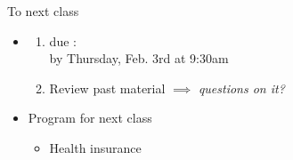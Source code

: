 \begin{frame}{To next class}
    \begin{itemize}
        \item {}
        \begin{enumerate}
            \item {} due :\\
            by Thursday, Feb. 3rd at 9:30am
            \item Review past material $\implies$ \textit{questions on it?}
        \end{enumerate}
        \vspace{5mm}

        \item Program for next class
        \begin{itemize}
            \item Health insurance
        \end{itemize}
    \end{itemize}
\end{frame}
